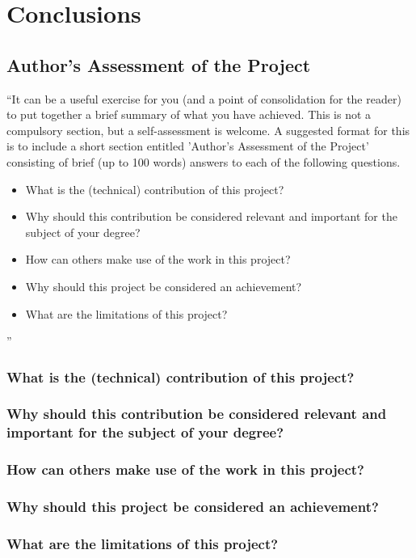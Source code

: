 \chapter{Conclusions}\label{ch:conclusions}
\section{Author's Assessment of the Project}
``It can be a useful exercise for you (and a point of consolidation for the reader) to put together a brief summary of what you have achieved. This is not a compulsory section, but a self-assessment is welcome. A suggested format for this is to include a short section entitled 'Author's Assessment of the Project' consisting of brief (up to 100 words) answers to each of the following questions.

\begin{itemize}
\item What is the (technical) contribution of this project?
\item Why should this contribution be considered relevant and important for the subject of your degree?
\item How can others make use of the work in this project?
\item Why should this project be considered an achievement?
\item What are the limitations of this project?
\end{itemize}''
\subsection*{What is the (technical) contribution of this project?}

\subsection*{Why should this contribution be considered relevant and important for the subject of your degree?}

\subsection*{How can others make use of the work in this project?}

\subsection*{Why should this project be considered an achievement?}

\subsection*{What are the limitations of this project?}
